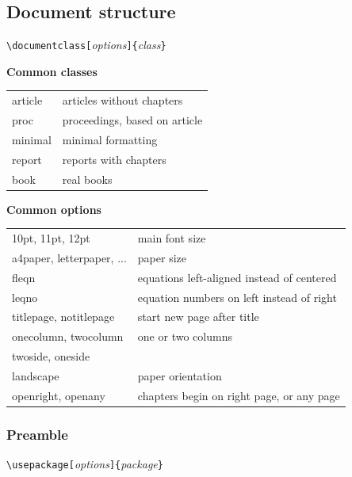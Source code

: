 \documentclass[12pt]{article}
\begin{document}
\subsection{Document structure}

\verb+\documentclass[+\emph{options}\verb+]{+\emph{class}\verb+}+

\textbf{Common classes} \\
\begin{tabular}{@{}ll}
article  &  articles without chapters      \\
proc     &  proceedings, based on article  \\
minimal  &  minimal formatting             \\
report   &  reports with chapters          \\
book     &  real books                     \\
\end{tabular}

\textbf{Common options} \\
\begin{tabular}{@{}ll}
10pt, 11pt, 12pt           &  main font size                              \\
a4paper, letterpaper, ...  &  paper size                                  \\
fleqn                      &  equations left-aligned instead of centered  \\
leqno                      &  equation numbers on left instead of right   \\
titlepage, notitlepage     &  start new page after title                  \\
onecolumn, twocolumn       &  one or two columns                          \\
twoside, oneside           &                                              \\
landscape                  &  paper orientation                           \\
openright, openany         &  chapters begin on right page, or any page   \\
\end{tabular}

\subsubsection*{Preamble}

\verb+\usepackage[+\emph{options}\verb+]{+\emph{package}\verb+}+
\end{document}
